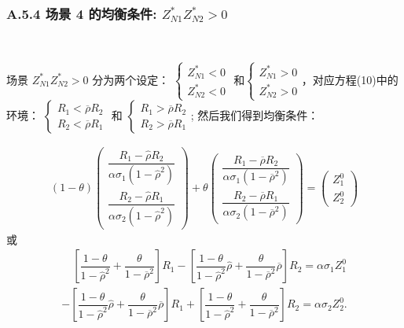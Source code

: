 \documentclass[10.0pt]{article}
\begin{document}
\subsubsection*{A.5.4 \quad 场景 4 的均衡条件: $ Z_{N 1}^* Z_{N 2}^* > 0 $}

\quad \ 


场景 $ Z_{N 1}^* Z_{N 2}^* > 0 $ 分为两个设定： $ \left\{ \begin{matrix} Z_{N 1}^* < 0 \\ Z_{N 2 }^* < 0 \end{matrix} \right. $ 和$ \left\{ \begin{matrix} Z_{N 1}^* > 0 \\ Z_{N 2}^* > 0 \end{matrix} \right. $，对应方程(10)中的环境： $ \left\{ \begin{matrix} R_1 < \overline{\rho} R_2 \\ R_2 < \overline{\rho} R_1 \end{matrix} \right. $ 和  $ \left\{ \begin{matrix} R_1 > \overline{\rho} R_2 \\ R_2 > \overline{\rho} R_1 \end{matrix} \right. $; 然后我们得到均衡条件：


\begin{eqnarray}
(1 - \theta) \left( \begin{matrix} \dfrac{R_1 - \hat \rho R_2}{\alpha \sigma_1 (1 - \hat \rho^2)} \\ \dfrac{R_2 - \hat \rho R_1}{\alpha \sigma_2 (1 - \hat \rho^2)} \end{matrix} \right) + \theta \left( \begin{matrix} \dfrac{R_1 - \overline{\rho} R_2}{\alpha \sigma_1 (1 - \overline{\rho}^2)} \\ \dfrac{R_2 - \overline{\rho} R_1}{\alpha \sigma_2 (1 - \overline{\rho}^2)} \end{matrix} \right) = \left( \begin{matrix} Z_1^0 \\ Z_2^0 \end{matrix} \right)
\end{eqnarray}
或
\begin{eqnarray*}
& \quad \left[ \dfrac{1 - \theta}{1 - {\hat \rho}^2} + \dfrac{\theta}{1 - \overline{\rho}^2} \right] R_1 - \left[ \dfrac{1 - \theta}{1 - {\hat \rho}^2} {\hat \rho} + \dfrac{\theta}{1 - \overline{\rho}^2} \overline{\rho} \right] R_2 = \alpha \sigma_1 Z_1^0 & \\
& - \left[ \dfrac{1 - \theta}{1 - {\hat \rho}^2} {\hat \rho} + \dfrac{\theta}{1 - \overline{\rho}^2} \overline{\rho} \right] R_1 + \left[ \dfrac{1 - \theta}{1 - {\hat \rho}^2} + \dfrac{\theta}{1 - \overline{\rho}^2} \right] R_2 = \alpha \sigma_2 Z_2^0. & 
\end{eqnarray*}
\end{document}
